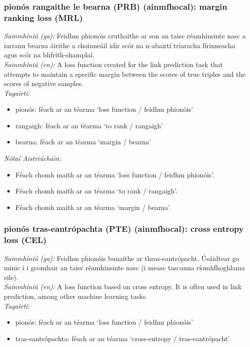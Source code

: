\subsubsection*{pionós rangaithe le bearna (PRB) (ainmfhocal): margin ranking loss (MRL)}
 \noindent \textit{Sainmhíniú (ga):} Feidhm phionóis cruthaithe ar son an taisc réamhinsinte nasc a iarrann bearna áirithe a choinneáil idir scór na n-abairtí triaracha fírinneacha agus scór na bhfrith-shamplaí.
\\
 \noindent \textit{Sainmhíniú (en):} A loss function created for the link prediction task that attempts to maintain a specific margin between the scores of true triples and the scores of negative samples.
\\
 \noindent \textit{Tagairtí:}
\begin{itemize}
	\item pionós: féach ar an téarma `loss function / feidhm phionóis'
	\item rangaigh: féach ar an téarma `to rank / rangaigh'
	\item bearna: féach ar an téarma `margin / bearna'
\end{itemize}

 \noindent \textit{Nótaí Aistriúcháin:}
\begin{itemize}
	\item Féach chomh maith ar an téarma `loss function / feidhm phionóis'.
	\item Féach chomh maith ar an téarma `to rank / rangaigh'.
	\item Féach chomh maith ar an téarma `margin / bearna'.
\end{itemize}


\subsubsection*{pionós tras-eantrópachta (PTE) (ainmfhocal): cross entropy loss (CEL)}
 \noindent \textit{Sainmhíniú (ga):} Feidhm phionóis bunaithe ar thras-eantrópacht. Úsáidtear go minic í i gcomhair an taisc réamhinsinte nasc (i measc tascanna ríomhfhoghlama eile).
\\
 \noindent \textit{Sainmhíniú (en):} A loss function based on cross entropy. It is often used in link prediction, among other machine learning tasks.
\\
 \noindent \textit{Tagairtí:}
\begin{itemize}
	\item pionós: féach ar an téarma `loss function / feidhm phionóis'
	\item tras-eantrópachta: féach ar an téarma `cross-entropy / tras-eantrópacht'
\end{itemize}

